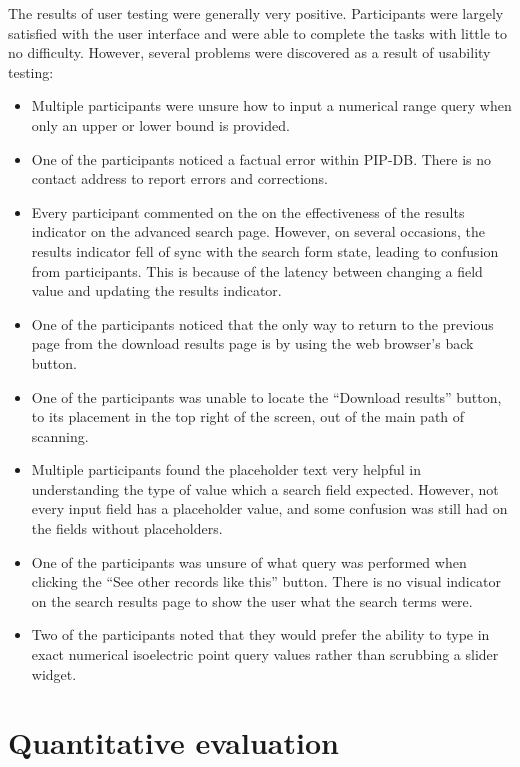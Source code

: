 The results of user testing were generally very positive. Participants
were largely satisfied with the user interface and were able to
complete the tasks with little to no difficulty. However, several
problems were discovered as a result of usability testing:

\begin{itemize}
\item Multiple participants were unsure how to input a numerical range
  query when only an upper or lower bound is provided.
\item One of the participants noticed a factual error within
  PIP-DB. There is no contact address to report errors and
  corrections.
\item Every participant commented on the on the effectiveness of the
  results indicator on the advanced search page. However, on several
  occasions, the results indicator fell of sync with the search form
  state, leading to confusion from participants. This is because of
  the latency between changing a field value and updating the results
  indicator.
\item One of the participants noticed that the only way to return to
  the previous page from the download results page is by using the web
  browser's back button.
\item One of the participants was unable to locate the ``Download
  results'' button, to its placement in the top right of the screen,
  out of the main path of scanning.
\item Multiple participants found the placeholder text very helpful in
  understanding the type of value which a search field
  expected. However, not every input field has a placeholder value,
  and some confusion was still had on the fields without placeholders.
\item One of the participants was unsure of what query was performed
  when clicking the ``See other records like this'' button. There is
  no visual indicator on the search results page to show the user what
  the search terms were.
\item Two of the participants noted that they would prefer the ability
  to type in exact numerical isoelectric point query values rather
  than scrubbing a slider widget.
\end{itemize}

\section{Quantitative evaluation}\label{sec:quantitative-evaluation}

